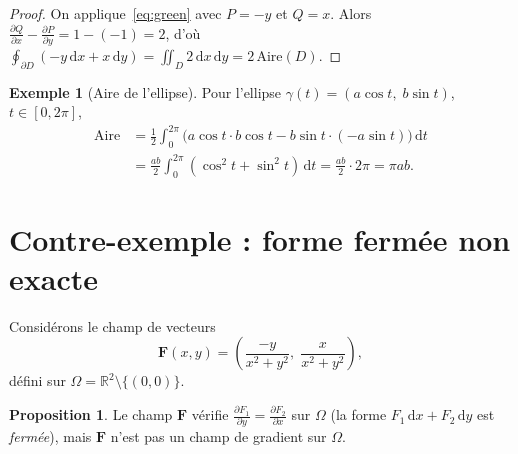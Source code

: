 \documentclass[12pt,a4paper,openany]{book}
\theoremstyle{definition}
\newtheorem{proposition}{Proposition}[chapter]
\newtheorem{exemple}{Exemple}[chapter]
\newcommand{\R}{\mathbb{R}}
\newcommand{\dd}{\mathrm{d}}
\begin{document}
\begin{proof}
  On applique~\eqref{eq:green} avec $P = -y$ et $Q = x$. Alors
  $\frac{\partial Q}{\partial x} - \frac{\partial P}{\partial y}
  = 1 - (-1) = 2$, d'où
  $\oint_{\partial D}(-y\,\dd x + x\,\dd y) = \iint_D 2\,\dd x\,\dd y
  = 2\,\text{Aire}(D)$.
\end{proof}

\begin{exemple}[Aire de l'ellipse]\label{ex:aire-ellipse-green}
  Pour l'ellipse $\gamma(t) = (a\cos t,\; b\sin t)$, $t \in [0,2\pi]$,
  \begin{align*}
    \text{Aire} &= \frac{1}{2}\int_0^{2\pi}
    \bigl(a\cos t\cdot b\cos t - b\sin t\cdot(-a\sin t)\bigr)\,\dd t \\
    &= \frac{ab}{2}\int_0^{2\pi}(\cos^2 t + \sin^2 t)\,\dd t
    = \frac{ab}{2}\cdot 2\pi = \pi ab.
  \end{align*}
\end{exemple}



\section{Contre-exemple : forme fermée non exacte}
\label{sec:contre-exemple}


Considérons le champ de vecteurs
\begin{equation}\label{eq:champ-non-exact}
  \mathbf{F}(x,y) = \left(\frac{-y}{x^2+y^2},\;
  \frac{x}{x^2+y^2}\right),
\end{equation}
défini sur $\Omega = \R^2\setminus\{(0,0)\}$.

\begin{proposition}\label{prop:forme-fermee}
  Le champ $\mathbf{F}$ vérifie $\frac{\partial F_1}{\partial y}
  = \frac{\partial F_2}{\partial x}$ sur $\Omega$ (la forme
  $F_1\,\dd x + F_2\,\dd y$ est \emph{fermée}), mais $\mathbf{F}$
  n'est pas un champ de gradient sur $\Omega$.
\end{proposition}
\end{document}
